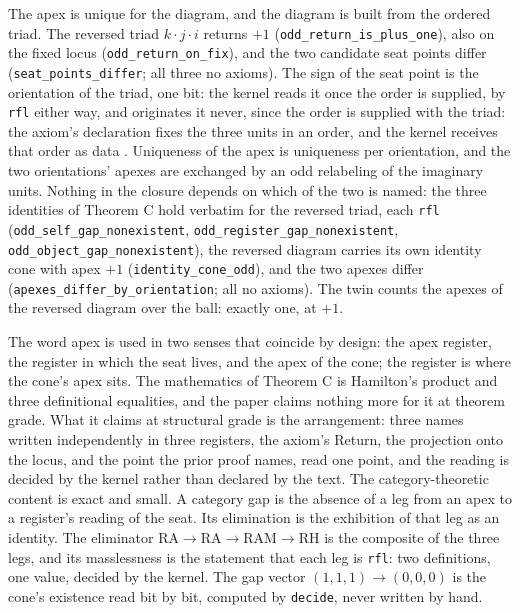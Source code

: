 \documentclass[10pt,twocolumn]{article}
\begin{document}
The apex is unique for the diagram, and the diagram is built from the
ordered triad. The reversed triad \(k \cdot j \cdot i\) returns \(+1\)
(\texttt{odd\_\allowbreak return\_\allowbreak is\_\allowbreak plus\_\allowbreak one}),
also on the fixed locus
(\texttt{odd\_\allowbreak return\_\allowbreak on\_\allowbreak fix}), and
the two candidate seat points differ
(\texttt{seat\_\allowbreak points\_\allowbreak differ}; all three no
axioms). The sign of the seat point is the orientation of the triad, one
bit: the kernel reads it once the order is supplied, by \texttt{rfl}
either way, and originates it never, since the order is supplied with
the triad: the axiom's declaration fixes the three units in an order,
and the kernel receives that order as data \cite{islamraf}. Uniqueness
of the apex is uniqueness per orientation, and the two orientations'
apexes are exchanged by an odd relabeling of the imaginary units.
Nothing in the closure depends on which of the two is named: the three
identities of Theorem C hold verbatim for the reversed triad, each
\texttt{rfl}
(\texttt{odd\_\allowbreak self\_\allowbreak gap\_\allowbreak nonexistent},
\texttt{odd\_\allowbreak register\_\allowbreak gap\_\allowbreak nonexistent},
\texttt{odd\_\allowbreak object\_\allowbreak gap\_\allowbreak nonexistent}),
the reversed diagram carries its own identity cone with apex \(+1\)
(\texttt{identity\_\allowbreak cone\_\allowbreak odd}), and the two
apexes differ
(\texttt{apexes\_\allowbreak differ\_\allowbreak by\_\allowbreak orientation};
all no axioms). The twin counts the apexes of the reversed diagram over
the ball: exactly one, at \(+1\).

The word apex is used in two senses that coincide by design: the apex
register, the register in which the seat lives, and the apex of the
cone; the register is where the cone's apex sits. The mathematics of
Theorem C is Hamilton's product and three definitional equalities, and
the paper claims nothing more for it at theorem grade. What it claims at
structural grade is the arrangement: three names written independently
in three registers, the axiom's Return, the projection onto the locus,
and the point the prior proof names, read one point, and the reading is
decided by the kernel rather than declared by the text. The
category-theoretic content is exact and small. A category gap is the
absence of a leg from an apex to a register's reading of the seat. Its
elimination is the exhibition of that leg as an identity. The eliminator
\(\mathrm{RA} \to \mathrm{RA} \to \mathrm{RAM} \to \mathrm{RH}\) is the
composite of the three legs, and its masslessness is the statement that
each leg is \texttt{rfl}: two definitions, one value, decided by the
kernel. The gap vector \((1,1,1) \to (0,0,0)\) is the cone's existence
read bit by bit, computed by \texttt{decide}, never written by hand.
\end{document}
